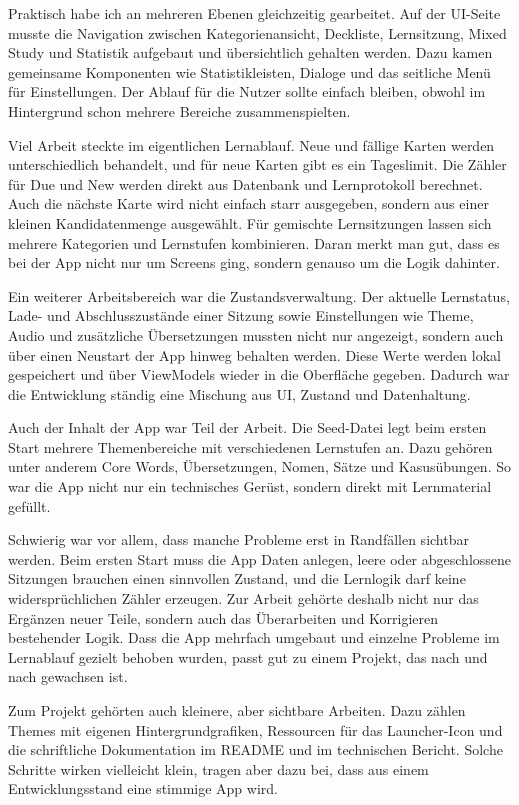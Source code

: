 \documentclass{Vorlage}
\begin{document}
Praktisch habe ich an mehreren Ebenen gleichzeitig gearbeitet. Auf der UI-Seite musste die Navigation zwischen Kategorienansicht, Deckliste, Lernsitzung, Mixed Study und Statistik aufgebaut und \"ubersichtlich gehalten werden. Dazu kamen gemeinsame Komponenten wie Statistikleisten, Dialoge und das seitliche Men\"u f\"ur Einstellungen. Der Ablauf f\"ur die Nutzer sollte einfach bleiben, obwohl im Hintergrund schon mehrere Bereiche zusammenspielten.

Viel Arbeit steckte im eigentlichen Lernablauf. Neue und f\"allige Karten werden unterschiedlich behandelt, und f\"ur neue Karten gibt es ein Tageslimit. Die Z\"ahler f\"ur Due und New werden direkt aus Datenbank und Lernprotokoll berechnet. Auch die n\"achste Karte wird nicht einfach starr ausgegeben, sondern aus einer kleinen Kandidatenmenge ausgew\"ahlt. F\"ur gemischte Lernsitzungen lassen sich mehrere Kategorien und Lernstufen kombinieren. Daran merkt man gut, dass es bei der App nicht nur um Screens ging, sondern genauso um die Logik dahinter.

Ein weiterer Arbeitsbereich war die Zustandsverwaltung. Der aktuelle Lernstatus, Lade- und Abschlusszust\"ande einer Sitzung sowie Einstellungen wie Theme, Audio und zus\"atzliche \"Ubersetzungen mussten nicht nur angezeigt, sondern auch \"uber einen Neustart der App hinweg behalten werden. Diese Werte werden lokal gespeichert und \"uber ViewModels wieder in die Oberfl\"ache gegeben. Dadurch war die Entwicklung st\"andig eine Mischung aus UI, Zustand und Datenhaltung.

Auch der Inhalt der App war Teil der Arbeit. Die Seed-Datei legt beim ersten Start mehrere Themenbereiche mit verschiedenen Lernstufen an. Dazu geh\"oren unter anderem Core Words, \"Ubersetzungen, Nomen, S\"atze und Kasus\"ubungen. So war die App nicht nur ein technisches Ger\"ust, sondern direkt mit Lernmaterial gef\"ullt.

Schwierig war vor allem, dass manche Probleme erst in Randf\"allen sichtbar werden. Beim ersten Start muss die App Daten anlegen, leere oder abgeschlossene Sitzungen brauchen einen sinnvollen Zustand, und die Lernlogik darf keine widerspr\"uchlichen Z\"ahler erzeugen. Zur Arbeit geh\"orte deshalb nicht nur das Erg\"anzen neuer Teile, sondern auch das \"Uberarbeiten und Korrigieren bestehender Logik. Dass die App mehrfach umgebaut und einzelne Probleme im Lernablauf gezielt behoben wurden, passt gut zu einem Projekt, das nach und nach gewachsen ist.

Zum Projekt geh\"orten auch kleinere, aber sichtbare Arbeiten. Dazu z\"ahlen Themes mit eigenen Hintergrundgrafiken, Ressourcen f\"ur das Launcher-Icon und die schriftliche Dokumentation im README und im technischen Bericht. Solche Schritte wirken vielleicht klein, tragen aber dazu bei, dass aus einem Entwicklungsstand eine stimmige App wird.
\end{document}
